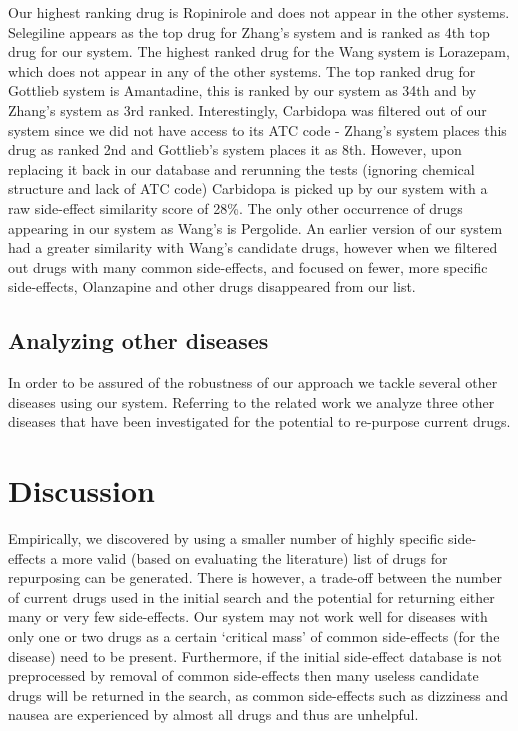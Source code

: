 \documentclass[preprint,12pt]{elsarticle}
\begin{document}
Our highest ranking drug is Ropinirole and does not appear in the other systems. Selegiline appears as the top drug for Zhang's system and is ranked as 4th top drug for our system. The highest ranked drug for the Wang system is Lorazepam, which does not appear in any of the other systems. The top ranked drug for Gottlieb system is Amantadine, this is ranked by our system as 34th and by Zhang's system as 3rd ranked. Interestingly, Carbidopa was filtered out of our system since we did not have access to its ATC code - Zhang's system places this drug as ranked 2nd and Gottlieb's system places it as 8th. However, upon replacing it back in our database and rerunning the tests (ignoring chemical structure and lack of ATC code) Carbidopa is picked up by our system with a raw side-effect similarity score of 28\%. The only other occurrence of drugs appearing in our system as Wang's is Pergolide. An earlier version of our system had a greater similarity with Wang's candidate drugs, however when we filtered out drugs with many common side-effects, and focused on fewer, more specific side-effects, Olanzapine and other drugs disappeared from our list. 

\subsection{Analyzing other diseases}
In order to be assured of the robustness of our approach we tackle several other diseases using our system. Referring to the related work we analyze three other diseases that have been investigated for the potential to re-purpose current drugs. 

\section{Discussion}
Empirically, we discovered by using a smaller number of highly specific side-effects a more valid (based on evaluating the literature) list of drugs for repurposing can be generated. There is however, a trade-off between the number of current drugs used in the initial search and the potential for returning either many or very few side-effects. Our system may not work well for diseases with only one or two drugs as a certain `critical mass' of common side-effects (for the disease) need to be present. Furthermore, if the initial side-effect database is not preprocessed by removal of common side-effects then many useless candidate drugs will be returned in the search, as common side-effects such as dizziness and nausea are experienced by almost all drugs and thus are unhelpful. 
\end{document}
